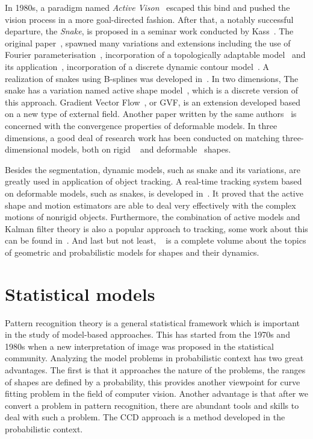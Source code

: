 In 1980s, a paradigm named \textit{Active Vison}~\cite{aloimonos1988active} escaped this bind and
pushed the vision process in a more goal-directed fashion. After that, a
notably successful departure, the \textit{Snake}, is proposed in a
seminar work conducted by Kass~\cite{kass1988snakes}. The original paper~\cite{kass1988snakes}, spawned many variations
and extensions including the use of Fourier parameterisation~\cite{scott1987alternative}, incorporation
of a topologically adaptable model~\cite{mcinerney1995topologically} and
its application~\cite{mcinemey1999topology}, incorporation of a discrete
dynamic contour model~\cite{lobregt1995discrete}. A realization of snakes
using B-splines was developed in~\cite{brigger2000b}. In two
dimensions, The snake has a variation named active shape
model~\cite{cootes1995active}, which is a discrete version of this
approach. Gradient Vector Flow~\cite{xu1998snakes}, or GVF, is an extension developed
based on a new type of external field. Another paper written by the same
authors~\cite{xu2000gradient} is concerned with the convergence properties of
deformable models. In three dimensions, a good deal of research work has
been conducted on matching three-dimensional models, both on rigid
~\cite{harris1993tracking} and deformable~\cite{terzopoulos1991dynamic} shapes. 

Besides the segmentation,
dynamic models, such as snake and its variations, are greatly used in application of object
tracking. A real-time tracking system based on deformable models, such
as snakes, is developed
in~\cite{terzopoulos1992tracking}. It proved that the active shape and
motion estimators are able to deal very effectively with the complex
motions of nonrigid objects. Furthermore, the combination of active
models and Kalman filter theory is also a popular approach to
tracking, some work about this can be found
in~\cite{schick1991simultaneous}. And last but not least,
~\cite{blake1998active} is a complete volume about the topics of
geometric and probabilistic models  for shapes and their dynamics.

\section{Statistical models}
\label{sec:sm}
Pattern recognition theory is a general statistical framework which is
important in the study of model-based approaches. This has started from the 1970s
and 1980s when a new interpretation of image was proposed in the
statistical community.  Analyzing the model problems in probabilistic
context has two great advantages. The first is that it approaches the
nature of the problems, the ranges of shapes are defined by a
probability, this provides another viewpoint for curve fitting problem
in the field of computer vision. Another advantage is that after we
convert a problem in pattern recognition, there are abundant tools and
skills to deal with such a problem. 
The CCD approach is a method developed in the probabilistic context. 

